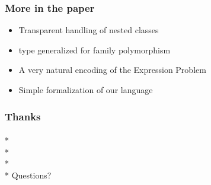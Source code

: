 \begin{frame}[fragile]
\frametitle{More in the paper}

\begin{itemize}
\item Transparent handling of nested classes
\item \Q@This@ type generalized for family polymorphism
\item A very natural encoding of the Expression Problem 
\item Simple formalization of our language
\end{itemize}

\end{frame}

\begin{frame}[fragile]
\frametitle{Thanks}
${}_{}$\\*
${}_{}$\\*
${}_{}$\\*
${}_{}$\\*
Questions?
\end{frame}



